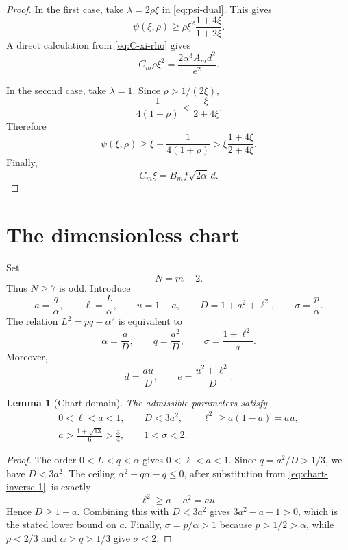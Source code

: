 \documentclass[11pt]{article}
\newtheorem{lemma}[theorem]{Lemma}
\begin{document}
\begin{proof}
In the first case, take \(\lambda=2\rho\xi\) in
\eqref{eq:psi-dual}.  This gives
\[
       \psi(\xi,\rho)\ge
       \rho\xi^2\frac{1+4\xi}{1+2\xi}.
\]
A direct calculation from \eqref{eq:C-xi-rho} gives
\[
       C_m\rho\xi^2=\frac{2\alpha^3A_md^2}{e^2}.
\]

In the second case, take \(\lambda=1\).  Since
\(\rho>1/(2\xi)\),
\[
       \frac1{4(1+\rho)}<\frac{\xi}{2+4\xi}.
\]
Therefore
\[
 \psi(\xi,\rho)
 \ge\xi-\frac1{4(1+\rho)}
 >\xi\frac{1+4\xi}{2+4\xi}.
\]
Finally,
\[
       C_m\xi=B_mf\sqrt{2\alpha}\,d.
\]
\end{proof}

\section{The dimensionless chart}\label{sec:chart}

Set
\begin{equation}\label{eq:N-def}
       N=m-2.
\end{equation}
Thus \(N\ge7\) is odd.  Introduce
\begin{equation}\label{eq:chart-basic}
 a=\frac q\alpha,
 \qquad
 \ell=\frac L\alpha,
 \qquad
 u=1-a,
 \qquad
 D=1+a^2+\ell^2,
 \qquad
 \sigma=\frac p\alpha.
\end{equation}
The relation \(L^2=pq-\alpha^2\) is equivalent to
\begin{equation}\label{eq:chart-inverse-1}
       \alpha=\frac aD,
       \qquad q=\frac{a^2}{D},
       \qquad \sigma=\frac{1+\ell^2}{a}.
\end{equation}
Moreover,
\begin{equation}\label{eq:chart-d-e}
       d=\frac{au}{D},
       \qquad e=\frac{u^2+\ell^2}{D}.
\end{equation}

\begin{lemma}[Chart domain]\label{lem:chart-domain}
The admissible parameters satisfy
\begin{equation}\label{eq:chart-domain}
\begin{gathered}
 0<\ell<a<1,
 \qquad
 D<3a^2,
 \qquad
 \ell^2\ge a(1-a)=au,\\
 a>\frac{1+\sqrt{13}}6>\frac34,
 \qquad
 1<\sigma<2.
\end{gathered}
\end{equation}
\end{lemma}

\begin{proof}
The order \(0<L<q<\alpha\) gives \(0<\ell<a<1\).  Since
\(q=a^2/D>1/3\), we have \(D<3a^2\).  The ceiling
\(\alpha^2+q\alpha-q\le0\), after substitution from
\eqref{eq:chart-inverse-1}, is exactly
\[
       \ell^2\ge a-a^2=au.
\]
Hence \(D\ge1+a\).  Combining this with \(D<3a^2\) gives
\(3a^2-a-1>0\), which is the stated lower bound on \(a\).  Finally,
\(\sigma=p/\alpha>1\) because \(p>1/2>\alpha\), while
\(p<2/3\) and \(\alpha>q>1/3\) give \(\sigma<2\).
\end{proof}
\end{document}
